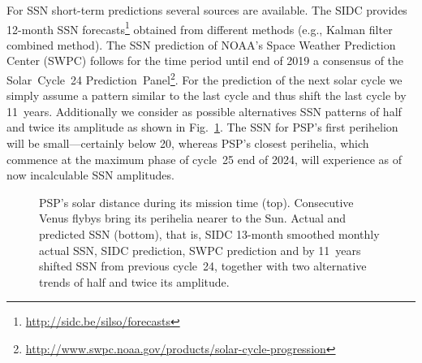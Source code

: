 For SSN short-term predictions several sources are available. The SIDC provides 12-month SSN forecasts\footnote{\url{http://sidc.be/silso/forecasts}} obtained from different methods (e.g., Kalman filter combined method). The SSN prediction of NOAA's Space Weather Prediction Center (SWPC) follows for the time period until end of 2019 a consensus of the Solar~Cycle~24 Prediction~Panel\footnote{\url{http://www.swpc.noaa.gov/products/solar-cycle-progression}}.
For the prediction of the next solar cycle we simply assume a pattern similar to the last cycle and thus shift the last cycle by 11~years. Additionally we consider as possible alternatives SSN patterns of half and twice its amplitude as shown in Fig.~\ref{fig:SPP_orbit_predicted_SSN_overview_e_plot}.
The SSN for PSP's first perihelion will be small---certainly below 20, whereas PSP’s closest perihelia, which commence at the maximum phase of cycle~25 end of 2024, will experience as of now incalculable SSN amplitudes.
\begin{figure}
	\caption{PSP's solar distance during its mission time (top). Consecutive Venus flybys bring its perihelia nearer to the Sun. Actual and predicted SSN (bottom), that is, SIDC 13-month smoothed monthly actual SSN, SIDC prediction, SWPC prediction and by 11~years shifted SSN from previous cycle~24, together with two alternative trends of half and twice its amplitude.}
	\label{fig:SPP_orbit_predicted_SSN_overview_e_plot}
\end{figure}

